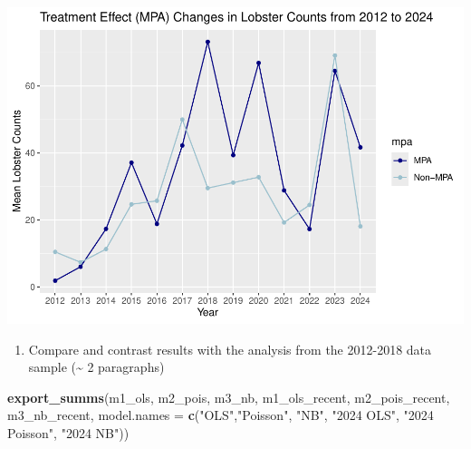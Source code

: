 \documentclass[
]{article}
\newenvironment{Shaded}{\begin{snugshade}}{\end{snugshade}}
\newcommand{\AttributeTok}[1]{\textcolor[rgb]{0.13,0.29,0.53}{#1}}
\newcommand{\FunctionTok}[1]{\textcolor[rgb]{0.13,0.29,0.53}{\textbf{#1}}}
\newcommand{\NormalTok}[1]{#1}
\newcommand{\StringTok}[1]{\textcolor[rgb]{0.31,0.60,0.02}{#1}}
\providecommand{\tightlist}{%
  \setlength{\itemsep}{0pt}\setlength{\parskip}{0pt}}
\begin{document}
\includegraphics{hw1-lobstrs-eds241_files/figure-latex/unnamed-chunk-47-1.pdf}

\begin{enumerate}
\def\labelenumi{\alph{enumi}.}
\setcounter{enumi}{2}
\tightlist
\item
  Compare and contrast results with the analysis from the 2012-2018 data
  sample (\textasciitilde{} 2 paragraphs)
\end{enumerate}

\begin{Shaded}
\begin{Highlighting}[]
\FunctionTok{export\_summs}\NormalTok{(m1\_ols, m2\_pois, m3\_nb, m1\_ols\_recent, m2\_pois\_recent, m3\_nb\_recent,}
             \AttributeTok{model.names =} \FunctionTok{c}\NormalTok{(}\StringTok{"OLS"}\NormalTok{,}\StringTok{"Poisson"}\NormalTok{, }\StringTok{"NB"}\NormalTok{, }\StringTok{"2024 OLS"}\NormalTok{, }\StringTok{"2024 Poisson"}\NormalTok{, }\StringTok{"2024 NB"}\NormalTok{))}
\end{Highlighting}
\end{Shaded}

 
  \providecommand{\huxb}[2]{\arrayrulecolor[RGB]{#1}\global\arrayrulewidth=#2pt}
  \providecommand{\huxvb}[2]{\color[RGB]{#1}\vrule width #2pt}
  \providecommand{\huxtpad}[1]{\rule{0pt}{#1}}
  \providecommand{\huxbpad}[1]{\rule[-#1]{0pt}{#1}}
\end{document}
